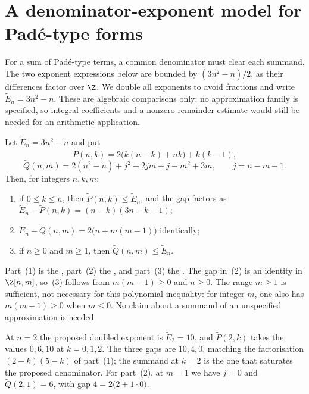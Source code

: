 \section{A denominator-exponent model for Pad\'e-type
forms}\label{long1049:sec:pade}

For a sum of Pad\'e-type terms, a common denominator must clear
each summand. The two exponent expressions below are bounded by
$(3n^2-n)/2$, as their differences factor over $\Z$. We double all
exponents to avoid fractions and write $\widetilde E_n=3n^2-n$.
These are algebraic comparisons only: no approximation family is
specified, so integral coefficients and a nonzero remainder estimate
would still be needed for an arithmetic application.

\begin{proposition}\label{long1049:res:pade}
Let $\widetilde{E}_n=3n^{2}-n$ and put
\[
 \widetilde{P}(n,k)=2\bigl(k(n-k)+nk\bigr)+k(k-1),
\]
\[
 \widetilde{Q}(n,m)=2(n^{2}-n)+j^{2}+2jm+j-m^{2}+3m,
 \qquad j=n-m-1 .
\]
Then, for integers $n,k,m$:
\begin{enumerate}
\item if $0\le k\le n$, then $\widetilde{P}(n,k)\le\widetilde{E}_n$, and the
gap factors as
$\widetilde{E}_n-\widetilde{P}(n,k)=(n-k)(3n-k-1)$;
\item $\widetilde{E}_n-\widetilde{Q}(n,m)=2\bigl(n+m(m-1)\bigr)$ identically;
\item if $n\ge0$ and $m\ge1$, then $\widetilde{Q}(n,m)\le\widetilde{E}_n$.
\end{enumerate}
\end{proposition}

\noindent Part~(1) is the
, part~(2) the
, and part~(3) the
.  The gap in~(2) is an identity in $\Z[n,m]$, so~(3) follows
from $m(m-1)\ge0$ and $n\ge0$. The range $m\ge1$ is sufficient,
not necessary for this polynomial inequality: for integer $m$, one
also has $m(m-1)\ge0$ when $m\le0$. No claim about a summand of an
unspecified approximation is needed.

\begin{example}\label{long1049:ex:pade}
At $n=2$ the proposed doubled exponent is $\widetilde{E}_2=10$, and
$\widetilde{P}(2,k)$ takes the values $0,6,10$ at $k=0,1,2$.  The three gaps are
$10,4,0$, matching the factorisation $(2-k)(5-k)$ of part~(1); the summand at
$k=2$ is the one that saturates the proposed denominator.  For part~(2), at
$m=1$ we have $j=0$ and $\widetilde{Q}(2,1)=6$, with gap
$4=2\bigl(2+1\cdot0\bigr)$.
\end{example}

